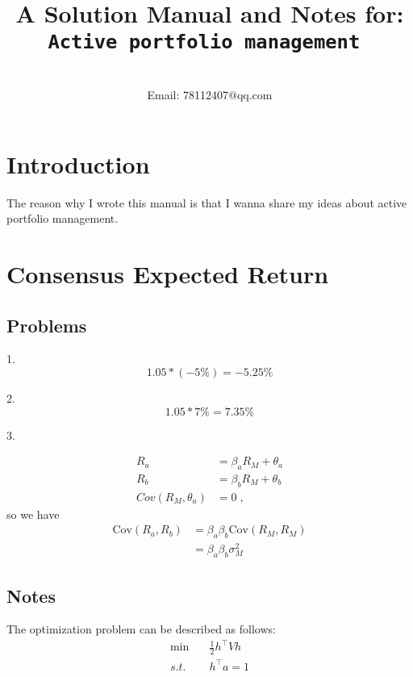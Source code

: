 \documentclass[12pt,a4paper]{report}
\title{A Solution Manual and Notes for: \\
\tt{Active portfolio management} }
\author{\sc{Haifeng XU} \\ Email: {78112407@qq.com}}
\begin{document}
\maketitle
\tableofcontents


\chapter{Introduction}

The reason why I wrote this manual is that I wanna share my ideas about
active portfolio management.


\chapter{Consensus Expected Return}

\section{Problems}


1. $$ 1.05 * (-5\%) = - 5.25\% $$

2. $$ 1.05 * 7\%  =  7.35 \% $$

3.

\begin{align*}
    R_a &= \beta_a R_M + \theta_a \\
    R_b &= \beta_b R_M + \theta_b \\
    Cov( R_M , \theta_a ) &= 0 \;,
\end{align*}
so we have
\begin{align*}
    \text{Cov}( R_a , R_b ) &= \beta_a \beta_b \text{Cov}( R_M, R_M ) \\
    &= \beta_a \beta_b \sigma_M^2
\end{align*}

\section{Notes}

The optimization problem can be described as follows:
\begin{align}
    \min &\quad \frac{1}{2} h^\top V h \\
    s.t. &\quad h^\top a = 1
\end{align}
\end{document}
